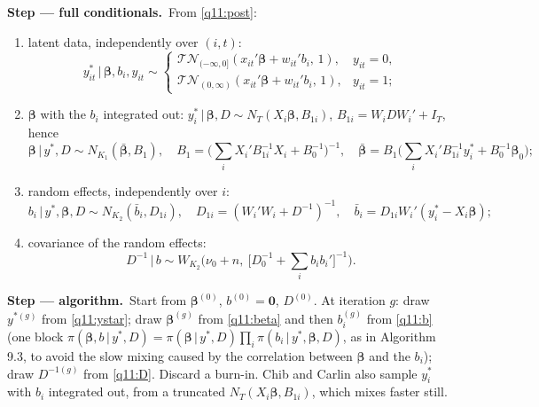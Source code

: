 \documentclass[11pt,a4paper]{article}
\numberwithin{equation}{questao}
\newcommand{\passo}[2]{\par\smallskip\noindent\textbf{Step --- #1.}~#2}
\newcommand{\TN}{\mathcal{TN}}
\begin{document}
\begin{sol}
\passo{full conditionals}{From \eqref{q11:post}:
\begin{enumerate}[label=(\alph*),leftmargin=2em]
\item latent data, independently over $(i,t)$:
\begin{equation}
y_{it}^*\,|\,\boldsymbol\beta,b_i,y_{it}\sim\begin{cases}\TN_{(-\infty,0]}(x_{it}'\boldsymbol\beta+w_{it}'b_i,\,1), & y_{it}=0,\\ \TN_{(0,\infty)}(x_{it}'\boldsymbol\beta+w_{it}'b_i,\,1), & y_{it}=1;\end{cases} \label{q11:ystar}
\end{equation}
\item $\boldsymbol\beta$ with the $b_i$ integrated out: $y_i^*\,|\,\boldsymbol\beta,D\sim N_T(X_i\boldsymbol\beta,B_{1i})$, $B_{1i}=W_iDW_i'+I_T$, hence
\begin{equation}
\boldsymbol\beta\,|\,y^*,D\sim N_{K_1}(\bar{\boldsymbol\beta},B_1),\quad B_1=\Big(\sum_iX_i'B_{1i}^{-1}X_i+B_0^{-1}\Big)^{-1},\quad\bar{\boldsymbol\beta}=B_1\Big(\sum_iX_i'B_{1i}^{-1}y_i^*+B_0^{-1}\boldsymbol\beta_0\Big); \label{q11:beta}
\end{equation}
\item random effects, independently over $i$:
\begin{equation}
b_i\,|\,y^*,\boldsymbol\beta,D\sim N_{K_2}(\bar b_i,D_{1i}),\quad D_{1i}=(W_i'W_i+D^{-1})^{-1},\quad\bar b_i=D_{1i}W_i'(y_i^*-X_i\boldsymbol\beta); \label{q11:b}
\end{equation}
\item covariance of the random effects:
\begin{equation}
D^{-1}\,|\,b\sim W_{K_2}\Big(\nu_0+n,\ \big[D_0^{-1}+\textstyle\sum_ib_ib_i'\big]^{-1}\Big). \label{q11:D}
\end{equation}
\end{enumerate}}

\passo{algorithm}{Start from $\boldsymbol\beta^{(0)}$, $b^{(0)}=\mathbf0$, $D^{(0)}$. At iteration $g$: draw $y^{*(g)}$ from
\eqref{q11:ystar}; draw $\boldsymbol\beta^{(g)}$ from \eqref{q11:beta} and then $b_i^{(g)}$ from \eqref{q11:b} (one block
$\pi(\boldsymbol\beta,b\,|\,y^*,D)=\pi(\boldsymbol\beta\,|\,y^*,D)\prod_i\pi(b_i\,|\,y^*,\boldsymbol\beta,D)$, as in Algorithm 9.3, to
avoid the slow mixing caused by the correlation between $\boldsymbol\beta$ and the $b_i$); draw $D^{-1(g)}$ from
\eqref{q11:D}. Discard a burn-in. Chib and Carlin also sample $y_i^*$ with $b_i$ integrated out, from a
truncated $N_T(X_i\boldsymbol\beta,B_{1i})$, which mixes faster still.}


\end{sol}
\end{document}
